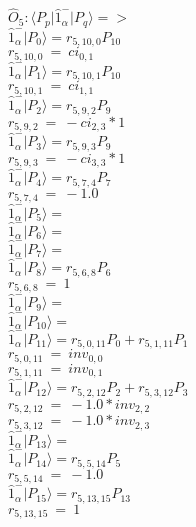 \documentclass[14pt]{article}
\begin{document}
    $\hat{O}_{5}:  \langle{P_p}\vert \hat{1}_{\alpha}^{-} \vert{P_q}\rangle => $ \\ 
    $ \hat{1}_{\alpha}^{-} \vert{P_{0}}\rangle = {r}_{5,10,0}P_{10} $ \\ 
    ${r}_{5,10,0}\ =\ {ci}_{0,1} $ \\ 
    $ \hat{1}_{\alpha}^{-} \vert{P_{1}}\rangle = {r}_{5,10,1}P_{10} $ \\ 
    ${r}_{5,10,1}\ =\ {ci}_{1,1} $ \\ 
    $ \hat{1}_{\alpha}^{-} \vert{P_{2}}\rangle = {r}_{5,9,2}P_{9} $ \\ 
    ${r}_{5,9,2}\ =\ -{ci}_{2,3}*1 $ \\ 
    $ \hat{1}_{\alpha}^{-} \vert{P_{3}}\rangle = {r}_{5,9,3}P_{9} $ \\ 
    ${r}_{5,9,3}\ =\ -{ci}_{3,3}*1 $ \\ 
    $ \hat{1}_{\alpha}^{-} \vert{P_{4}}\rangle = {r}_{5,7,4}P_{7} $ \\ 
    ${r}_{5,7,4}\ =\ -1.0 $ \\ 
    $ \hat{1}_{\alpha}^{-} \vert{P_{5}}\rangle =  $ \\ 
    $ \hat{1}_{\alpha}^{-} \vert{P_{6}}\rangle =  $ \\ 
    $ \hat{1}_{\alpha}^{-} \vert{P_{7}}\rangle =  $ \\ 
    $ \hat{1}_{\alpha}^{-} \vert{P_{8}}\rangle = {r}_{5,6,8}P_{6} $ \\ 
    ${r}_{5,6,8}\ =\ 1 $ \\ 
    $ \hat{1}_{\alpha}^{-} \vert{P_{9}}\rangle =  $ \\ 
    $ \hat{1}_{\alpha}^{-} \vert{P_{10}}\rangle =  $ \\ 
    $ \hat{1}_{\alpha}^{-} \vert{P_{11}}\rangle = {r}_{5,0,11}P_{0}+{r}_{5,1,11}P_{1} $ \\ 
    ${r}_{5,0,11}\ =\ {inv}_{0,0} $ \\ 
    ${r}_{5,1,11}\ =\ {inv}_{0,1} $ \\ 
    $ \hat{1}_{\alpha}^{-} \vert{P_{12}}\rangle = {r}_{5,2,12}P_{2}+{r}_{5,3,12}P_{3} $ \\ 
    ${r}_{5,2,12}\ =\ -1.0*{inv}_{2,2} $ \\ 
    ${r}_{5,3,12}\ =\ -1.0*{inv}_{2,3} $ \\ 
    $ \hat{1}_{\alpha}^{-} \vert{P_{13}}\rangle =  $ \\ 
    $ \hat{1}_{\alpha}^{-} \vert{P_{14}}\rangle = {r}_{5,5,14}P_{5} $ \\ 
    ${r}_{5,5,14}\ =\ -1.0 $ \\ 
    $ \hat{1}_{\alpha}^{-} \vert{P_{15}}\rangle = {r}_{5,13,15}P_{13} $ \\ 
    ${r}_{5,13,15}\ =\ 1 $ \\ 
    
\end{document}
